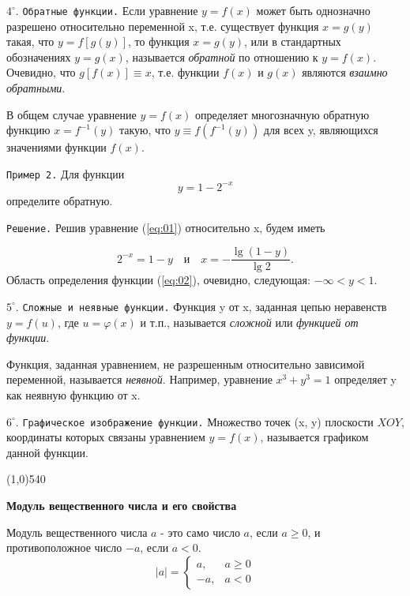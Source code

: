 \documentclass[12pt]{article}
\begin{document}
$4^{\circ}$. {\tt Обратные функции.} Если уравнение $y=f(x)$ может быть однозначно разрешено относительно переменной x, т.е. существует функция $x=g(y)$ такая, что $y=f[g(y)]$, то функция $x=g(y)$, или в стандартных обозначениях $y=g(x)$, называется {\it обратной} по отношению к $y=f(x)$. Очевидно, что $g[f(x)]\equiv x$, т.е. функции $f(x)$ и $g(x)$ являются {\it взаимно обратными}.

В общем случае уравнение $y=f(x)$ определяет многозначную обратную функцию $x=f^{-1}(y)$ такую, что $y\equiv f(f^{-1}(y))$ для всех y, являющихся значениями функции $f(x)$.\vspace{1mm}

{\tt Пример 2.} Для функции
\begin{equation}\label{eq:01}
	y=1-2^{-x}
\end{equation}
определите обратную.

{\tt Решение.} Решив уравнение (\ref{eq:01}) относительно x, будем иметь 

\begin{equation}\label{eq:02}
	2^{-x} = 1-y\quad\text{и}\quad x = -\frac{\lg(1-y)}{\lg 2}.
\end{equation}
Область определения функции (\ref{eq:02}), очевидно, следующая: $-\infty<y<1$.\vspace{2mm}

$5^{\circ}.$ {\tt Сложные и неявные функции.} Функция y от x, заданная цепью неравенств $y=f(u)$, где $u=\varphi(x)$ и т.п., называется {\it сложной} или {\it функцией от функции}.

Функция, заданная уравнением, не разрешенным относительно зависимой переменной, называется {\it неявной}. Например, уравнение $x^3+y^3=1$ определяет y как неявную функцию от x.\vspace{2mm}

$6^{\circ}$. {\tt Графическое изображение функции.} Множество точек (x, y) плоскости $XOY$, координаты которых связаны уравнением $y=f(x)$, называется графиком данной функции.

\hspace{-2mm}\line(1,0){540}

{\bf Модуль вещественного числа и его свойства}

 Модуль вещественного числа $a$ - это само число $a$, если $a\ge0$, и противоположное число $-a$, если $a<0$.
	\begin{equation*}
		|a| = \begin{cases}
			a, &a\ge0 \\
			-a, &a<0
		\end{cases}
	\end{equation*}
	
\end{document}
